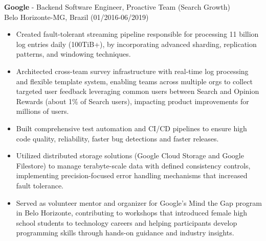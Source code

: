 
\normalsize{\textbf{Google} - Backend Software Engineer, Proactive Team (Search Growth)}\\
    \footnotesize{Belo Horizonte-MG, Brazil (01/2016-06/2019)}
    
\begin{itemize}
    \item \small{Created fault-tolerant streaming pipeline responsible for processing 11 billion
        log entries daily (100TiB+), by incorporating advanced sharding, replication patterns, and
        windowing techniques.}

    \item \small{Architected cross-team survey infrastructure with real-time log processing and flexible 
        template system, enabling teams across multiple orgs to collect targeted user feedback 
        leveraging common users between Search and Opinion Rewards (about 1\% of Search users),
        impacting product improvements for millions of users.}

    \item \small{Built comprehensive test automation and CI/CD pipelines to ensure high code 
        quality, reliability, faster bug detections and faster releases.}

    \clearpage

    \item \small{Utilized distributed storage solutions (Google Cloud Storage and Google
        Filestore) to manage terabyte-scale data with defined consistency controls, implementing
        precision-focused error handling mechanisms that increased fault tolerance.}

    \item \small{Served as volunteer mentor and organizer for Google's Mind the Gap program 
        in Belo Horizonte, contributing to workshops that introduced female high school students to 
        technology careers and helping participants develop programming skills through hands-on 
        guidance and industry insights.}
\end{itemize}